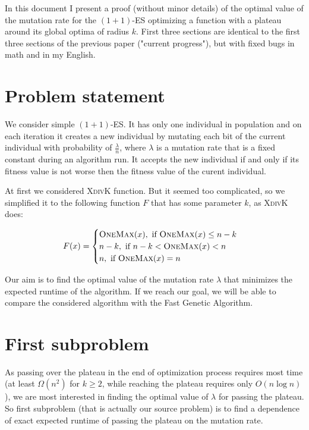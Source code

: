 \documentclass{article}
\newcommand{\OM}{\textsc{OneMax}\xspace}
\newcommand{\XdK}{\textsc{XdivK}\xspace}
\begin{document}
In this document I present a proof (without minor details) of the optimal value of the mutation rate for the $(1 + 1)$-ES optimizing a function with a plateau around its global optima of radius $k$. First three sections are identical to the first three sections of the previous paper ("current progress"), but with fixed bugs in math and in my English.

\section{Problem statement}

We consider simple $(1 + 1)$-ES. It has only one individual in population and on each iteration it creates a new individual by mutating each bit of the current individual with probability of $\frac{\lambda}{n}$, where $\lambda$ is a mutation rate that is a fixed constant during an algorithm run. It accepts the new individual if and only if its fitness value is not worse then the fitness value of the curent individual.

At first we considered \XdK function. But it seemed too complicated, so we simplified it to the following function $F$ that has some parameter $k$, as \XdK does:

\begin{align*}
  F(x) =
  \begin{cases}
    \OM(x), \text{ if } \OM(x) \le n - k \\
    n - k, \text{ if } n - k < \OM(x) < n \\
    n, \text{ if } \OM(x) = n \\
  \end{cases}
\end{align*}

Our aim is to find the optimal value of the mutation rate $\lambda$ that minimizes the expected runtime of the algorithm. If we reach our goal, we will be able to compare the considered algorithm with the Fast Genetic Algorithm.

\section{First subproblem}
As passing over the plateau in the end of optimization process requires most time (at least $\Omega(n^2)$ for $k \ge 2$, while reaching the plateau requires only $O(n \log n)$), we are most interested in finding the optimal value of $\lambda$ for passing the plateau. So first subproblem (that is actually our source problem) is to find a dependence of exact expected runtime of passing the plateau on the mutation rate.
\end{document}
